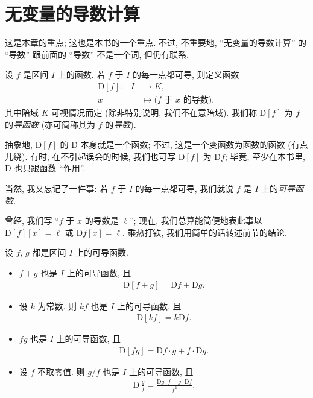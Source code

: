 \section{无变量的导数计算}

这是本章的重点; 这也是本书的一个重点. 不过, 不重要地, ``无变量的导数计算'' 的 ``导数'' 跟前面的 ``导数'' 不是一个词, 但仍有联系.

\begin{definition}
    设 $f$ 是区间 $I$ 上的函数. 若 $f$ 于 $I$ 的每一点都可导, 则定义函数
    \begin{align*}
        \text{$\mathrm{D}[f]$:} \quad
        I & \to K,                          \\
        x & \mapsto \text{($f$ 于 $x$ 的导数)},
    \end{align*}
    其中陪域 $K$ 可视情况而定 (除非特别说明, 我们不在意陪域). 我们称 $\mathrm{D}[f]$ 为 $f$ 的\emph{导函数} (亦可简称其为 $f$ 的\emph{导数}).
\end{definition}

抽象地, $\mathrm{D}[f]$ 的 $\mathrm{D}$ 本身就是一个函数; 不过, 这是一个变函数为函数的函数 (有点儿绕). 有时, 在不引起误会的时候, 我们也可写 $\mathrm{D}[f]$ 为 $\mathrm{D}f$; 毕竟, 至少在本书里, $\mathrm{D}$ 也只跟函数 ``作用''.

当然, 我又忘记了一件事: 若 $f$ 于 $I$ 的每一点都可导, 我们就说 $f$ 是 $I$ 上的\emph{可导函数}.

曾经, 我们写 ``$f$ 于 $x$ 的导数是 $\ell$''; 现在, 我们总算能简便地表此事以 $\mathrm{D}[f][x] = \ell$ 或 $\mathrm{D}f[x] = \ell$. 乘热打铁, 我们用简单的话转述前节的结论.

\begin{theorem}
    设 $f$, $g$ 都是区间 $I$ 上的可导函数.
    \begin{itemize}
        \item $f + g$ 也是 $I$ 上的可导函数, 且
              \begin{align*}
                  \mathrm{D} [f + g] = \mathrm{D} f + \mathrm{D} g.
              \end{align*}
        \item 设 $k$ 为常数. 则 $kf$ 也是 $I$ 上的可导函数, 且
              \begin{align*}
                  \mathrm{D} [kf] = k\mathrm{D} f.
              \end{align*}
        \item $fg$ 也是 $I$ 上的可导函数, 且
              \begin{align*}
                  \mathrm{D} [fg] = \mathrm{D} f \cdot g + f \cdot \mathrm{D} g.
              \end{align*}
        \item 设 $f$ 不取零值. 则 $g/f$ 也是 $I$ 上的可导函数, 且
              \begin{align*}
                  \mathrm{D}\, \frac{g}{f} = \frac{\mathrm{D} g \cdot f - g \cdot \mathrm{D} f}{f^2}.
              \end{align*}
    \end{itemize}
\end{theorem}

